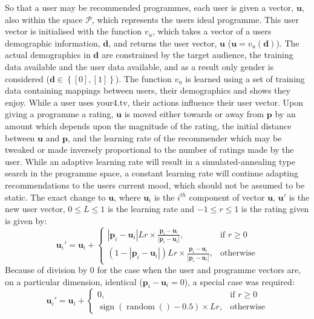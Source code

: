 So that a user may be recommended programmes, each user is given a vector, $\mathbf{u}$, also within the space $\mathcal{P}$, which represents the users ideal programme. This user vector is initialised with the function $v_u$, which takes a vector of a users demographic information, $\mathbf{d}$, and returns the user vector, $\mathbf{u}$ ($\mathbf{u} = v_u(\mathbf{d})$). The actual demographics in $\mathbf{d}$ are constrained by the target audience, the training data available and the user data available, and as a result only gender is considered ($\mathbf{d} \in \left\{{ \left[ 0\right] ,\left[ 1\right] }\right\} $). The function $v_u$ is learned using a set of training data containing mappings between users, their demographics and shows they enjoy. While a user uses your4.tv, their actions influence their user vector. Upon giving a programme a rating, $\mathbf{u}$ is moved either towards or away from $\mathbf{p}$ by an amount which depends upon the magnitude of the rating, the initial distance between $\mathbf{u}$ and $\mathbf{p}$, and the learning rate of the recommender which may be tweaked or made inversely proportional to the number of ratings made by the user. While an adaptive learning rate will result in a simulated-annealing type search in the programme space, a constant learning rate will continue adapting recommendations to the users current mood, which should not be assumed to be static. The exact change to $\mathbf{u}$, where $\mathbf{u}_{i}$ is the $i^{th}$ component of vector $\mathbf{u}$, $\mathbf{u}'$ is the new user vector, $0 \leq L \leq 1$ is the learning rate and $-1 \leq r \leq 1$ is the rating given is given by:
$$
	\mathbf{u}_{i}' =
	\mathbf{u}_{i} + \begin{cases}
		\left|\mathbf{p}_{i}-\mathbf{u}_{i}\right|Lr \times \frac{\mathbf{p}_{i}-\mathbf{u}_{i}}{\left|\mathbf{p}_{i}-\mathbf{u}_{i}\right|},&
			\text{if } r\geq 0\\
		(1-\left|\mathbf{p}_{i}-\mathbf{u}_{i}\right|)Lr \times \frac{\mathbf{p}_{i}-\mathbf{u}_{i}}{\left|\mathbf{p}_{i}-\mathbf{u}_{i}\right|},&
			\text{otherwise}
	\end{cases}
$$
Because of division by 0 for the case when the user and programme vectors are, on a particular dimension, identical ($\mathbf{p}_{i}-\mathbf{u}_{i}=0$), a special case was required:
$$
	\mathbf{u}_{i}' =
	\mathbf{u}_{i} + \begin{cases}
		0,&
			\text{if } r\geq 0\\
		\operatorname{sign}(\operatorname{random}()-0.5)\times Lr,&
			\text{otherwise}
	\end{cases}
$$

